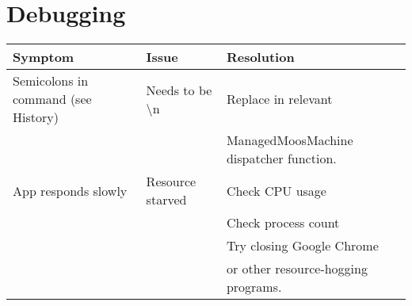 \documentclass[11pt]{article}
\begin{document}
\section{Debugging}
\begin{tabular}{l|l|l}
Symptom & Issue & Resolution\\
\hline
Semicolons in command (see History) & Needs to be {\textbackslash}n & Replace in relevant\\&& ManagedMoosMachine dispatcher function.\\
App responds slowly & Resource starved & Check CPU usage\\
&& Check process count\\
&& Try closing Google Chrome\\
&& or other resource-hogging programs.
\end{tabular}
\end{document}
